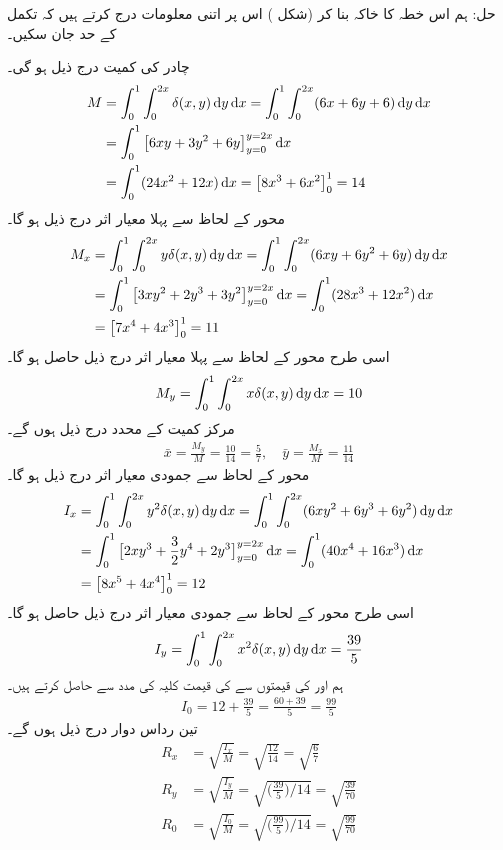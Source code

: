 حل:\quad
ہم اس خطہ کا خاکہ بنا کر (شکل )   اس پر اتنی معلومات درج کرتے ہیں کہ تکمل کے حد  جان سکیں۔

چادر کی کمیت درج ذیل ہو گی۔
\begin{align*}
M&=\int_0^1\int_0^{2x}\delta(x,y)\dif y\dif x=\int_0^1\int_0^{2x}(6x+6y+6)\dif y\dif x\\
&=\int_0^1\big[6xy+3y^2+6y\big]_{y=0}^{y=2x}\dif x\\
&=\int_0^1(24x^2+12x)\dif x=\big[8x^3+6x^2\big]_0^1=14
\end{align*}
محور  کے لحاظ سے پہلا معیار اثر درج ذیل ہو گا۔
\begin{align*}
M_x&=\int_0^1\int_0^{2x}y\delta(x,y)\dif y\dif x=\int_0^1\int_0^{2x}(6xy+6y^2+6y)\dif y\dif x\\
&=\int_0^1\big[3xy^2+2y^3+3y^2\big]_{y=0}^{y=2x}\dif x=\int_0^1 (28x^3+12x^2)\dif x\\
&=\big[7x^4+4x^3\big]_0^1=11
\end{align*}
اسی طرح محور  کے  لحاظ سے پہلا معیار اثر درج ذیل حاصل ہو گا۔
\begin{align*}
M_y=\int_0^1\int_0^{2x}x\delta(x,y)\dif y\dif x=10
\end{align*}
مرکز کمیت کے محدد درج ذیل ہوں گے۔
\begin{align*}
\bar{x}=\frac{M_y}{M}=\frac{10}{14}=\frac{5}{7},\quad \bar{y}=\frac{M_x}{M}=\frac{11}{14}
\end{align*} 
محور  کے لحاظ  سے جمودی معیار اثر درج ذیل ہو گا۔
\begin{align*}
I_x&=\int_0^1\int_0^{2x}y^2\delta(x,y)\dif y\dif x=\int_0^1\int_0^{2x}(6xy^2+6y^3+6y^2)\dif y\dif x\\
&=\int_0^1\big[2xy^3+\frac{3}{2}y^4+2y^3\big]_{y=0}^{y=2x}\dif x=\int_0^1(40x^4+16x^3)\dif x\\
&=\big[8x^5+4x^4\big]_0^1=12
\end{align*}
اسی طرح  محور  کے لحاظ سے جمودی معیار اثر درج ذیل حاصل ہو گا۔
\begin{align*}
I_y=\int_0^1\int_0^{2x}x^2\delta(x,y)\dif y\dif x=\frac{39}{5}
\end{align*}
ہم  اور  کی قیمتوں سے  کی قیمت کلیہ  کی مدد  سے  حاصل کرتے ہیں۔
\begin{align*}
I_0=12+\frac{39}{5}=\frac{60+39}{5}=\frac{99}{5}
\end{align*}
تین رداس دوار درج ذیل ہوں گے۔
\begin{align*}
R_x&=\sqrt{\frac{I_x}{M}}=\sqrt{\frac{12}{14}}=\sqrt{\frac{6}{7}}\\
R_y&=\sqrt{\frac{I_y}{M}}=\sqrt{\big(\frac{39}{5}\big)/14}=\sqrt{\frac{39}{70}}\\
R_0&=\sqrt{\frac{I_0}{M}}=\sqrt{\big(\frac{99}{5}\big)/14}=\sqrt{\frac{99}{70}}
\end{align*}
